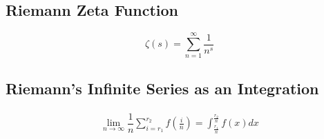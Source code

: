 \subsection{Riemann Zeta Function}
\begin{equation}
	\zeta(s)=\sum_{n=1}^\infty \dfrac{1}{n^s}
\end{equation}

\subsection{Riemann's Infinite Series as an Integration}
\label{riemannsum}
\begin{align}
	\lim_{n\to\infty} \dfrac{1}{n}\sum_{i=r_1}^{r_2} f(\frac{i}{n})=\int_{\frac{r_1}{n}}^{\frac{r_2}{n}} f(x) dx
\end{align}
